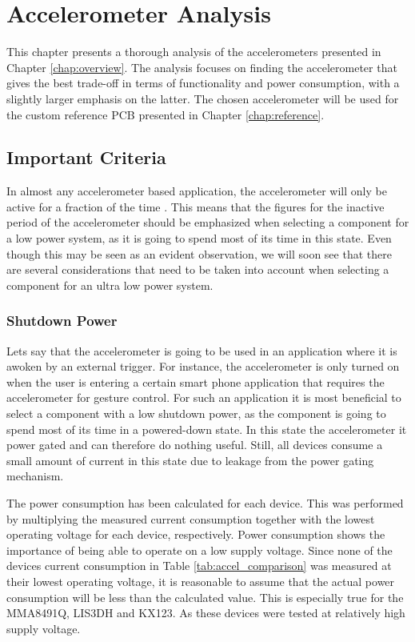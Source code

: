 \chapter{Accelerometer Analysis}
\label{chap:analysis}

This chapter presents a thorough analysis of the accelerometers presented in Chapter \ref{chap:overview}. The analysis focuses on finding the accelerometer that gives the best trade-off in terms of functionality and power consumption, with a slightly larger emphasis on the latter. The chosen accelerometer will be used for the custom reference PCB presented in Chapter \ref{chap:reference}.

\section{Important Criteria}

In almost any accelerometer based application, the accelerometer will only be active for a fraction of the time \cite{moldsvor15}. This means that the figures for the inactive period of the accelerometer should be emphasized when selecting a component for a low power system, as it is going to spend most of its time in this state. Even though this may be seen as an evident observation, we will soon see that there are several considerations that need to be taken into account when selecting a component for an ultra low power system. 

\subsection{Shutdown Power}

Lets say that the accelerometer is going to be used in an application where it is awoken by an external trigger. For instance, the accelerometer is only turned on when the user is entering a certain smart phone application that requires the accelerometer for gesture control. For such an application it is most beneficial to select a component with a low shutdown power, as the component is going to spend most of its time in a powered-down state. In this state the accelerometer it power gated and can therefore do nothing useful. Still, all devices consume a small amount of current in this state due to leakage from the power gating mechanism.   

The power consumption has been calculated for each device. This was performed by multiplying the measured current consumption together with the lowest operating voltage for each device, respectively. Power consumption shows the importance of being able to operate on a low supply voltage. Since none of the devices current consumption in Table \ref{tab:accel_comparison} was measured at their lowest operating voltage, it is reasonable to assume that the actual power consumption will be less than the calculated value. This is especially true for the MMA8491Q, LIS3DH and KX123. As these devices were tested at relatively high supply voltage. 

